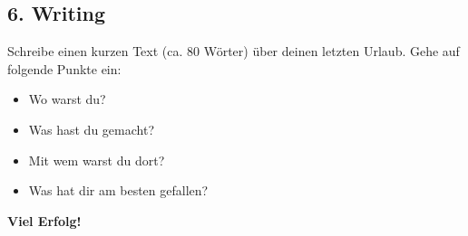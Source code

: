 \subsection*{6. Writing}
Schreibe einen kurzen Text (ca. 80 Wörter) über deinen letzten Urlaub. Gehe auf folgende Punkte ein:
\begin{itemize}
    \item Wo warst du?
    \item Was hast du gemacht?
    \item Mit wem warst du dort?
    \item Was hat dir am besten gefallen?
\end{itemize}

\vspace{1cm}
\textbf{Viel Erfolg!}
